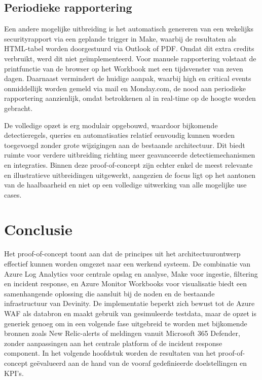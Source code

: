 \subsection{Periodieke rapportering}
Een andere mogelijke uitbreiding is het automatisch genereren van een wekelijks securityrapport via een geplande trigger in Make, waarbij de resultaten als HTML-tabel worden doorgestuurd via Outlook of PDF. Omdat dit extra credits verbruikt, werd dit niet geïmplementeerd. Voor manuele rapportering volstaat de printfunctie van de browser op het Workbook met een tijdsvenster van zeven dagen. Daarnaast vermindert de huidige aanpak, waarbij high en critical events onmiddellijk worden gemeld via mail en Monday.com, de nood aan periodieke rapportering aanzienlijk, omdat betrokkenen al in real-time op de hoogte worden gebracht.

De volledige opzet is erg modulair opgebouwd, waardoor bijkomende detectieregels, queries en automatisaties relatief eenvoudig kunnen worden toegevoegd zonder grote wijzigingen aan de bestaande architectuur. Dit biedt ruimte voor verdere uitbreiding richting meer geavanceerde detectiemechanismen en integraties. Binnen deze proof-of-concept zijn echter enkel de meest relevante en illustratieve uitbreidingen uitgewerkt, aangezien de focus ligt op het aantonen van de haalbaarheid en niet op een volledige uitwerking van alle mogelijke use cases.

\section{Conclusie}
Het proof-of-concept toont aan dat de principes uit het architectuurontwerp effectief kunnen worden omgezet naar een werkend systeem. De combinatie van Azure Log Analytics voor centrale opslag en analyse, Make voor ingestie, filtering en incident response, en Azure Monitor Workbooks voor visualisatie biedt een samenhangende oplossing die aansluit bij de noden en de bestaande infrastructuur van Devinity. De implementatie beperkt zich bewust tot de Azure WAF als databron en maakt gebruik van gesimuleerde testdata, maar de opzet is generiek genoeg om in een volgende fase uitgebreid te worden met bijkomende bronnen zoals New Relic-alerts of meldingen vanuit Microsoft 365 Defender, zonder aanpassingen aan het centrale platform of de incident response component. In het volgende hoofdstuk worden de resultaten van het proof-of-concept geëvalueerd aan de hand van de vooraf gedefinieerde doelstellingen en KPI's.
